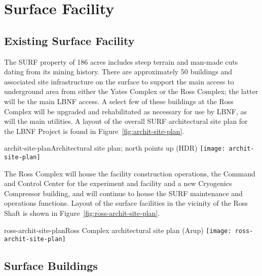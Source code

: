 \chapter{Surface Facility}
\label{ch:fscf-surf-facil}

\section{Existing Surface Facility}
\label{sec:fscf-surf-facil-existing}


The SURF property of 186 acres %
includes steep terrain and man-made cuts dating from its mining history. %
There are approximately 50 buildings and associated site infrastructure on the surface to support the main access to underground area from either the Yates Complex or the Ross Complex; the latter will be the main LBNF access. 
A select few of these buildings at the Ross Complex will be upgraded and rehabilitated as necessary for use by LBNF, as will the main utilities. A layout of the overall SURF architectural site plan for the LBNF Project is found in Figure~\ref{fig:archit-site-plan}.
\begin{cdrfigure}{archit-site-plan}{Architectural site plan; north points up (HDR)}
\texttt{[image: archit-site-plan]}
\end{cdrfigure}
The Ross Complex will house the facility construction operations, the Command and Control Center for the experiment and facility and a new Cryogenics Compressor building, and will continue to house the SURF maintenance and operations functions. Layout of the surface facilities in the vicinity of the Ross Shaft is shown in Figure~\ref{fig:ross-archit-site-plan}.

\begin{cdrfigure}{ross-archit-site-plan}{Ross Complex architectural site plan (Arup)}
\texttt{[image: ross-archit-site-plan]}
\end{cdrfigure}

\section{Surface Buildings}
\label{sec:fscf-surf-facil-surface-bldg}


